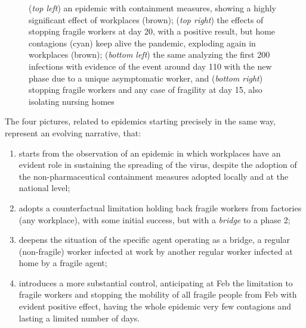 \documentclass[11pt]{article}
\begin{document}
\begin{figure}[H]
\caption{(\emph{top left}) an epidemic with containment measures, showing a highly significant effect of workplaces (brown);
 (\emph{top right}) the effects of stopping fragile workers at day 20, with a positive result, but home contagions (cyan) keep alive the pandemic, exploding again in workplaces (brown); (\emph{bottom left}) the same analyzing the first 200 infections with evidence of the event around day 110 with the new phase due to a unique asymptomatic worker, and (\emph{bottom right}) stopping fragile workers and any case of fragility at day 15, also isolating nursing homes} 
\label{fourSequences}
\end{figure}

The four pictures, related to epidemics starting precisely in the same way, represent an evolving narrative, that:

\begin{enumerate}

\item starts from the observation of an epidemic in which workplaces have an evident role in sustaining the spreading of the virus, despite the adoption of the non-pharmaceutical containment measures adopted locally and at the national level;

\item adopts a counterfactual limitation holding back fragile workers from factories (any workplace), with some initial success, but with a \emph{bridge} to a phase 2;

\item\label{micromicro} deepens the situation of the specific agent operating as a bridge, a regular (non-fragile) worker infected at work by another regular worker infected at home by a fragile agent;

\item introduces a more substantial  control, anticipating at Feb  the limitation to fragile workers and stopping the mobility of all fragile people from Feb  with evident positive effect, having the whole epidemic very few contagions and lasting a limited number of days.

\end{enumerate}
\end{document}

